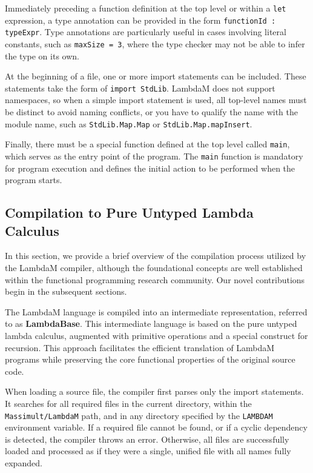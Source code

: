 \documentclass{IEEEtran}
\begin{document}
\begingroup
\vspace*{-\baselineskip}
\vspace*{\baselineskip}
\endgroup

\par Immediately preceding a function definition at the top level or within a \texttt{let} expression, a type annotation can be provided in the form \verb!functionId : typeExpr!. Type annotations are particularly useful in cases involving literal constants, such as \verb!maxSize = 3!, where the type checker may not be able to infer the type on its own.

\par At the beginning of a file, one or more import statements can be included. These statements take the form of \verb!import StdLib!. LambdaM does not support namespaces, so when a simple import statement is used, all top-level names must be distinct to avoid naming conflicts, or you have to qualify the name with the module name, such as \verb!StdLib.Map.Map! or \verb!StdLib.Map.mapInsert!.

\par Finally, there must be a special function defined at the top level called \verb!main!, which serves as the entry point of the program. The \verb!main! function is mandatory for program execution and defines the initial action to be performed when the program starts.

\subsection{Compilation to Pure Untyped Lambda Calculus}

\par In this section, we provide a brief overview of the compilation process utilized by the LambdaM compiler, although the foundational concepts are well established within the functional programming research community. Our novel contributions begin in the subsequent sections.

\par The LambdaM language is compiled into an intermediate representation, referred to as \textbf{LambdaBase}. This intermediate language is based on the pure untyped lambda calculus, augmented with primitive operations and a special construct for recursion. This approach facilitates the efficient translation of LambdaM programs while preserving the core functional properties of the original source code.

\par When loading a source file, the compiler first parses only the import statements. It searches for all required files in the current directory, within the \texttt{Massimult/LambdaM} path, and in any directory specified by the \texttt{LAMBDAM} environment variable. If a required file cannot be found, or if a cyclic dependency is detected, the compiler throws an error. Otherwise, all files are successfully loaded and processed as if they were a single, unified file with all names fully expanded.
\end{document}
